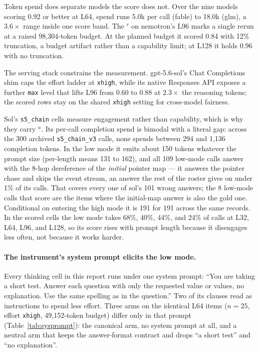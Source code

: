 \documentclass[11pt]{article}
\newcommand{\markr}{$^{r}$}
\newcommand{\marku}{$^{u}$}
\newcommand{\code}[1]{\texttt{#1}}
\begin{document}
Token spend does separate models the score does not. Over the nine models scoring 0.92 or
better at L64, spend runs 5.0k per call (fable) to 18.0k (glm), a $3.6\times$ range inside one
score band. The \markr{} on nemotron's L96 marks a single rerun at a raised 98{,}304-token
budget. At the planned budget it scored 0.84 with 12\% truncation, a budget artifact rather
than a capability limit; at L128 it holds 0.96 with no truncation.

The serving stack constrains the measurement. gpt-5.6-sol's Chat Completions shim caps the effort ladder at \code{xhigh}, while its native Responses API exposes a further \code{max} level that lifts L96 from 0.60 to 0.88 at $2.3\times$ the reasoning tokens; the scored rows stay on the shared \code{xhigh} setting for cross-model fairness.

Sol's \code{s5\_chain} cells measure engagement rather than capability, which is why they
carry \marku{}. Its per-call completion spend is bimodal with a literal gap: across the 300
archived \code{s5\_chain\_v3} calls, none spends between 294 and 1{,}136 completion tokens.
In the low mode it emits about 150 tokens whatever the prompt size (per-length means 131 to
162), and all 109 low-mode calls answer with the 8-hop dereference of the \emph{initial}
pointer map --- it answers the pointer chase and skips the event stream, an answer the rest
of the roster gives on under 1\% of its calls. That covers every one of sol's 101 wrong
answers; the 8 low-mode calls that score are the items where the initial-map answer is also
the gold one. Conditional on entering the high mode it is 191 for 191 across the same
records. In the scored cells the low mode takes 68\%, 40\%, 44\%, and 24\% of calls at L32,
L64, L96, and L128, so its score rises with prompt length because it disengages less often,
not because it works harder.

\paragraph{The instrument's system prompt elicits the low mode.} Every thinking cell in this
report runs under one system prompt: ``You are taking a short test. Answer each question with
only the requested value or values, no explanation. Use the same spelling as in the
question.'' Two of its clauses read as instructions to spend less effort. Three arms on the
identical L64 items ($n=25$, effort \code{xhigh}, 49{,}152-token budget) differ only in that
prompt (Table~\ref{tab:sysprompt}): the canonical arm, no system prompt at all, and a neutral
arm that keeps the answer-format contract and drops ``a short test'' and ``no explanation''.
\end{document}
